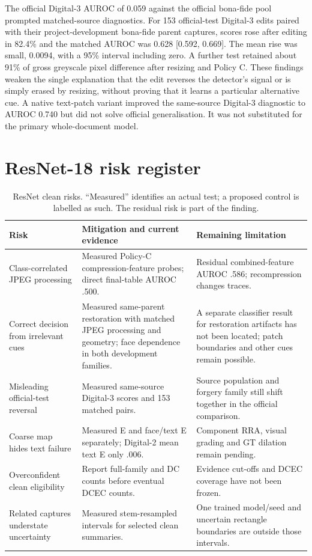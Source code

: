 The official Digital-3 AUROC of 0.059 against the official bona-fide pool prompted matched-source diagnostics. For 153 official-test Digital-3 edits paired with their project-development bona-fide parent captures, scores rose after editing in 82.4\% and the matched AUROC was 0.628 [0.592, 0.669]. The mean rise was small, 0.0094, with a 95\% interval including zero. A further test retained about 91\% of gross greyscale pixel difference after resizing and Policy C. These findings weaken the single explanation that the edit reverses the detector's signal or is simply erased by resizing, without proving that it learns a particular alternative cue. A native text-patch variant improved the same-source Digital-3 diagnostic to AUROC 0.740 but did not solve official generalisation. It was not substituted for the primary whole-document model.

\section{ResNet-18 risk register}

\begin{table}[htbp]
\centering\footnotesize
\caption{ResNet clean risks. ``Measured'' identifies an actual test; a proposed control is labelled as such. The residual risk is part of the finding.}
\label{tab:app-resnet-risks}
\begin{tabularx}{\textwidth}{@{}>{\raggedright\arraybackslash}p{}>{\raggedright\arraybackslash}p{}>{\raggedright\arraybackslash}X@{}}
\toprule
Risk & Mitigation and current evidence & Remaining limitation \\
\midrule
Class-correlated JPEG processing & Measured Policy-C compression-feature probes; direct final-table AUROC .500. & Residual combined-feature AUROC .586; recompression changes traces. \\
Correct decision from irrelevant cues & Measured same-parent restoration with matched JPEG processing and geometry; face dependence in both development families. & A separate classifier result for restoration artifacts has not been located; patch boundaries and other cues remain possible. \\
Misleading official-test reversal & Measured same-source Digital-3 scores and 153 matched pairs. & Source population and forgery family still shift together in the official comparison. \\
Coarse map hides text failure & Measured E and face/text E separately; Digital-2 mean text E only .006. & Component RRA, visual grading and GT dilation remain pending. \\
Overconfident clean eligibility & Report full-family and DC counts before eventual DCEC counts. & Evidence cut-offs and DCEC coverage have not been frozen. \\
Related captures understate uncertainty & Measured stem-resampled intervals for selected clean summaries. & One trained model/seed and uncertain rectangle boundaries are outside those intervals. \\
\bottomrule
\end{tabularx}
\end{table}

